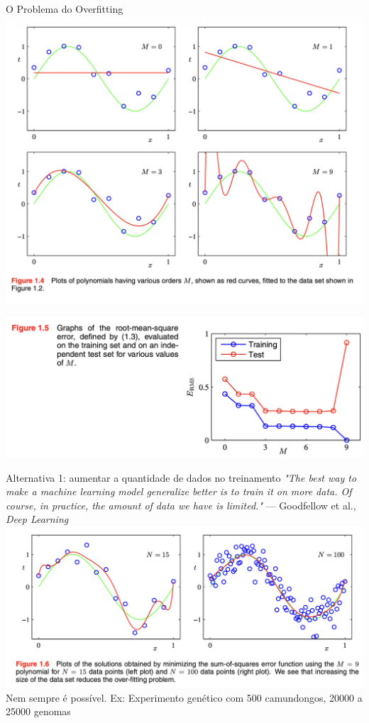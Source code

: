 \documentclass{beamer}
\begin{document}
\begin{frame}{O Problema do Overfitting}
\centering
\includegraphics[width=\textwidth,height=0.8\textheight,keepaspectratio]{imgs/bishop_example/1.png}
\end{frame}

\begin{frame}
\centering
\includegraphics[width=\textwidth,height=0.8\textheight,keepaspectratio]{imgs/bishop_example/2.png}
\end{frame}

\begin{frame}{Alternativa 1: aumentar a quantidade de dados no treinamento}
\tiny{\textit{"The best way to make a machine learning model generalize better is to train it on
more data. Of course, in practice, the amount of data we have is limited."} --- Goodfellow et al., \textit{Deep Learning}}
\centering
\includegraphics[width=\textwidth,height=0.8\textheight,keepaspectratio]{imgs/bishop_example/3.png}
Nem sempre é possível. Ex: Experimento genético com 500 camundongos, 20000 a 25000 genomas
\end{frame}
\end{document}
